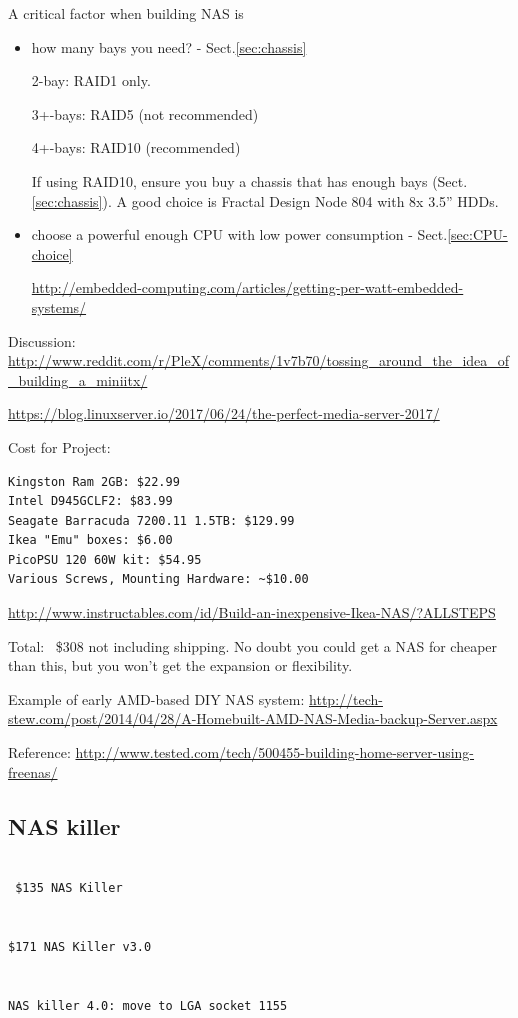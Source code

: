 A critical factor when building NAS is 
\begin{itemize}
  
  \item how many bays you need? - Sect.\ref{sec:chassis}
  
  2-bay: RAID1 only.
  
  3+-bays: RAID5 (not recommended)
  
  4+-bays: RAID10 (recommended)
  
  If using RAID10, ensure you buy a chassis that has enough bays
  (Sect.\ref{sec:chassis}). A good choice is Fractal Design Node 804 with 8x
  3.5'' HDDs.
  
  \item choose a powerful enough CPU with low power consumption -
  Sect.\ref{sec:CPU-choice}
  
  \url{http://embedded-computing.com/articles/getting-per-watt-embedded-systems/}
  
  
\end{itemize}

Discussion:
\url{http://www.reddit.com/r/PleX/comments/1v7b70/tossing_around_the_idea_of_building_a_miniitx/}

\url{https://blog.linuxserver.io/2017/06/24/the-perfect-media-server-2017/}



Cost for Project:
\begin{verbatim}
Kingston Ram 2GB: $22.99
Intel D945GCLF2: $83.99
Seagate Barracuda 7200.11 1.5TB: $129.99
Ikea "Emu" boxes: $6.00
PicoPSU 120 60W kit: $54.95 
Various Screws, Mounting Hardware: ~$10.00
\end{verbatim}
\url{http://www.instructables.com/id/Build-an-inexpensive-Ikea-NAS/?ALLSTEPS}

Total: ~\$308 not including shipping. No doubt you could get a NAS for cheaper
than this, but you won't get the expansion or flexibility.

Example of early AMD-based DIY NAS system:
\url{http://tech-stew.com/post/2014/04/28/A-Homebuilt-AMD-NAS-Media-backup-Server.aspx}

Reference:
\url{http://www.tested.com/tech/500455-building-home-server-using-freenas/}

\subsection{NAS killer }

\begin{verbatim}

 $135 NAS Killer
 
 
$171 NAS Killer v3.0 


NAS killer 4.0: move to LGA socket 1155


\end{verbatim}

